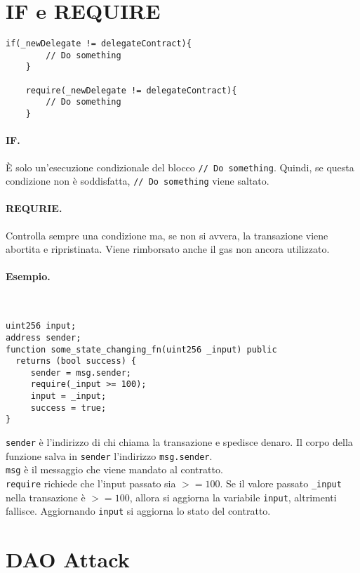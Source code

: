 \section{IF e REQUIRE}

\begin{lstlisting}[language=Solidity]
    if(_newDelegate != delegateContract){
        // Do something
    }

    require(_newDelegate != delegateContract){
        // Do something
    }
\end{lstlisting}

\paragraph{IF.}
È solo un'esecuzione condizionale del blocco \verb|// Do something|.
Quindi, se questa condizione non
è soddisfatta, \verb|// Do something| viene saltato.

\paragraph{REQURIE.}
Controlla sempre una condizione ma,
se non si avvera, la transazione viene abortita e
ripristinata. Viene rimborsato anche il gas non ancora utilizzato.
\ \\
\paragraph{Esempio.}\

\begin{lstlisting}[language=Solidity]
uint256 input;
address sender;
function some_state_changing_fn(uint256 _input) public 
  returns (bool success) {
     sender = msg.sender;
     require(_input >= 100);
     input = _input;
     success = true;
}
\end{lstlisting}

\verb|sender| è l'indirizzo di chi chiama la transazione e spedisce denaro.
Il corpo della funzione salva in \verb|sender| l'indirizzo \verb|msg.sender|.\\
\verb|msg| è il messaggio che viene
mandato al contratto.\\
\verb|require| richiede che l'input passato sia $ >= 100$.
Se il valore passato \verb|_input| nella transazione è $ >= 100$, allora si aggiorna la variabile \verb|input|, altrimenti fallisce. Aggiornando \verb|input| si aggiorna lo stato del contratto.

\section{DAO Attack}

